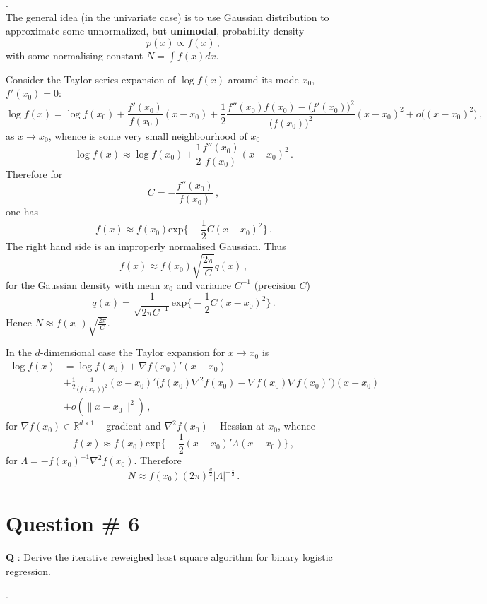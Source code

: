 \documentclass[a4paper]{article}
\newcommand{\Real}{\mathbb{R}}
\begin{document}
 .\hfill\\
The general idea (in the univariate case) is to use Gaussian distribution to approximate
some unnormalized, but \textbf{unimodal}, probability density
\[ p(x) \propto f(x) \,, \]
with some normalising constant $N = \int f(x) dx$.

Consider the Taylor series expansion of $\log f(x)$ around its mode $x_0$, $f'(x_0) = 0$:
\[
\log f(x)
= \log f(x_0) + \frac{f'(x_0)}{f(x_0)} (x-x_0)
+ \frac{1}{2} \frac{f''(x_0)f(x_0) - \bigl(f'(x_0)\bigr)^2}{\bigl(f(x_0)\bigr)^2} (x-x_0)^2 + o\bigl((x-x_0)^2\bigr)\,,
\]
as $x\to x_0$, whence is some very small neighbourhood of $x_0$
\[
\log f(x) \approx \log f(x_0) + \frac{1}{2} \frac{f''(x_0)}{f(x_0)} (x-x_0)^2\,.
\]
Therefore for 
\[ C = - \frac{f''(x_0)}{f(x_0)}\,, \]
one has 
\[ f(x) \approx f(x_0) \text{exp}\bigl\{ - \frac{1}{2} C (x-x_0)^2 \bigr\} \,. \]
The right hand side is an improperly normalised Gaussian. Thus
\[ f(x) \approx f(x_0) \sqrt{\frac{2\pi}{C}} q(x) \,, \]
for the Gaussian density with mean $x_0$ and variance $C^{-1}$ (precision $C$)
\[
q(x) = \frac{1}{\sqrt{2\pi C^{-1}}} \text{exp}\bigl\{ - \frac{1}{2} C (x-x_0)^2 \bigr\}\,.
\]
Hence $N \approx f(x_0) \sqrt{\frac{2\pi}{C}}$.

In the $d$-dimensional case the Taylor expansion for $x\to x_0$ is
\begin{align*}
\log f(x) &= \log f(x_0) + \nabla f(x_0)' (x-x_0) \\
	&+ \frac{1}{2} \frac{1}{\bigl(f(x_0)\bigr)^2} (x-x_0)'
		\bigl( f(x_0) \nabla^2 f(x_0) - \nabla f(x_0) \nabla f(x_0)' \bigr) (x-x_0) \\
	&+ o(\|x-x_0\|^2) \,,
\end{align*}
for $\nabla f(x_0)\in \Real^{d\times1}$ -- gradient and $\nabla^2 f(x_0)$ -- Hessian
at $x_0$, whence 
\[
f(x) \approx f(x_0) \text{exp}\biggl\{ - \frac{1}{2} (x-x_0)' \Lambda (x-x_0) \biggr\}\,,
\]
for $\Lambda = - f(x_0)^{-1} \nabla^2 f(x_0)$. Therefore
\[
N \approx f(x_0) (2\pi)^{\frac{d}{2}} |\Lambda|^{-\frac{1}{2}} \,.
\]

\clearpage

\section{Question \# 6} %
\label{sec:question_6}
\textbf{\large \textbf{Q}} : Derive the iterative reweighed least square algorithm for
binary logistic regression.

 .\hfill\\
\end{document}
